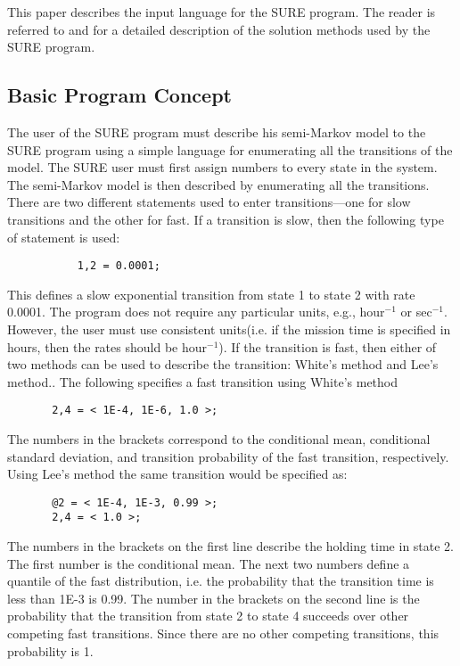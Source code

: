 This paper describes the input language for the SURE program.  The reader is
referred to \cite{Butler-SURE} and \cite{Butler-ieee-SURE} for a detailed
description of the solution methods used by the SURE program.

\subsection{Basic Program Concept}

The user of the SURE program must describe his semi-Markov model to the SURE
program using a simple language for enumerating all the transitions of the
model.  The SURE user must first assign numbers to every state in the system.
The semi-Markov model is then described by enumerating all the transitions.
There are two different statements used to enter transitions---one for slow
transitions and the other for fast.  If a transition is slow, then the
following type of statement is used:
\begin{verbatim}
           1,2 = 0.0001;
\end{verbatim}
This defines a slow exponential transition from state 1 to state 2 with rate
0.0001.  The program does not require any particular units, e.g., hour$^{-1}$
or sec$^{-1}$.  However, the user must use consistent units(i.e. if the
mission time is specified in hours, then the rates should be hour$^{-1}$).  If
the transition is fast, then either of two methods can be used to describe the
transition: White's method and Lee's method..  The following specifies a fast
transition using White's method
\begin{verbatim}
       2,4 = < 1E-4, 1E-6, 1.0 >;
\end{verbatim}
The numbers in the brackets correspond to the conditional mean, conditional
standard deviation, and transition probability of the fast transition,
respectively.  Using Lee's method the same transition would be specified as:
\begin{verbatim}
       @2 = < 1E-4, 1E-3, 0.99 >;
       2,4 = < 1.0 >;
\end{verbatim}

The numbers in the brackets on the first line describe the holding time in
state 2.  The first number is the conditional mean.  The next two numbers
define a quantile of the fast distribution, i.e. the probability that the
transition time is less than 1E-3 is 0.99.  The number in the brackets on the
second line is the probability that the transition from state 2 to state 4
succeeds over other competing fast transitions.  Since there are no other
competing transitions, this probability is 1.

